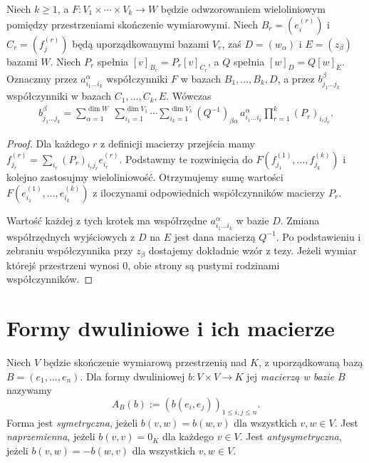\begin{stwierdzenie}
\label{prop:lin8-zmiana-baz}
Niech \(k\geq1\), a
\(F\colon V_1\times\cdots\times V_k\to W\)
będzie odwzorowaniem wieloliniowym
pomiędzy przestrzeniami
skończenie wymiarowymi.
Niech \(B_r=(e^{(r)}_i)\)
i \(C_r=(f^{(r)}_j)\)
będą uporządkowanymi bazami \(V_r\),
zaś \(D=(w_\alpha)\) i
\(E=(z_\beta)\) bazami \(W\).
Niech \(P_r\) spełnia
\([v]_{B_r}=P_r[v]_{C_r}\),
a \(Q\) spełnia
\([w]_D=Q[w]_E\).
Oznaczmy przez
\(a^\alpha_{i_1\ldots i_k}\)
współczynniki \(F\)
w bazach \(B_1,\ldots,B_k,D\),
a przez \(b^\beta_{j_1\ldots j_k}\)
współczynniki w bazach
\(C_1,\ldots,C_k,E\).
Wówczas
\[
 \begin{aligned}
 b^\beta_{j_1\ldots j_k}
 =\sum_{\alpha=1}^{\dim W}
  \ \sum_{i_1=1}^{\dim V_1}\cdots
  \sum_{i_k=1}^{\dim V_k}
 (Q^{-1})_{\beta\alpha}\,
 a^\alpha_{i_1\ldots i_k}
 \prod_{r=1}^{k}(P_r)_{i_rj_r}.
 \end{aligned}
\]
\end{stwierdzenie}
\begin{proof}
Dla każdego \(r\) z definicji
macierzy przejścia mamy
\(f^{(r)}_{j_r}
=\sum_{i_r}(P_r)_{i_rj_r}e^{(r)}_{i_r}\).
Podstawmy te rozwinięcia
do \(F(f^{(1)}_{j_1},\ldots,
f^{(k)}_{j_k})\) i kolejno
zastosujmy wieloliniowość.
Otrzymujemy sumę wartości
\(F(e^{(1)}_{i_1},\ldots,
e^{(k)}_{i_k})\)
z iloczynami odpowiednich
współczynników macierzy \(P_r\).

Wartość każdej z tych krotek
ma współrzędne
\(a^\alpha_{i_1\ldots i_k}\)
w bazie \(D\).
Zmiana współrzędnych wyjściowych
z \(D\) na \(E\) jest dana
macierzą \(Q^{-1}\).
Po podstawieniu i zebraniu
współczynnika przy \(z_\beta\)
dostajemy dokładnie wzór z tezy.
Jeżeli wymiar którejś przestrzeni
wynosi \(0\), obie strony są
pustymi rodzinami współczynników.
\end{proof}

\section{Formy dwuliniowe i ich macierze}
\label{sec:lin8-dwuliniowe}

\begin{definicja}
\label{def:lin8-forma-dwuliniowa}
Niech \(V\) będzie skończenie wymiarową
przestrzenią nad \(K\), z uporządkowaną
bazą \(B=(e_1,\ldots,e_n)\).
Dla formy dwuliniowej
\(b\colon V\times V\to K\)
jej \emph{macierzą w bazie \(B\)}
nazywamy
\[
 A_B(b):=(b(e_i,e_j))_{1\leq i,j\leq n}.
\]
Forma jest \emph{symetryczna},
jeżeli \(b(v,w)=b(w,v)\)
dla wszystkich \(v,w\in V\).
Jest \emph{naprzemienna},
jeżeli \(b(v,v)=0_K\)
dla każdego \(v\in V\).
Jest \emph{antysymetryczna},
jeżeli \(b(v,w)=-b(w,v)\)
dla wszystkich \(v,w\in V\).
\end{definicja}


